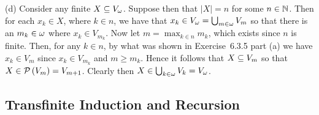 \begin{solution}
    (d) Consider any finite $X \ss V_\w$.
    Suppose then that $|X| = n$ for some $n \in \nats$.
    Then for each $x_k \in X$, where $k \in n$, we have that $x_k \in V_\w = \bigcup_{m \in \w} V_m$ so that there is an $m_k \in \w$ where $x_k \in V_{m_k}$.
    Now let $m = \max_{k \in n} m_k$, which exists since $n$ is finite.
    Then, for any $k \in n$, by what was shown in Exercise~6.3.5 part (a) we have $x_k \in V_m$ since $x_k \in V_{m_k}$ and $m \geq m_k$.
    Hence it follows that $X \ss V_m$ so that $X \in \pset{V_m} = V_{m+1}$.
    Clearly then $X \in \bigcup_{k \in \w} V_k = V_\w$. \qedsymbol
\end{solution}

\subsection{Transfinite Induction and Recursion}

